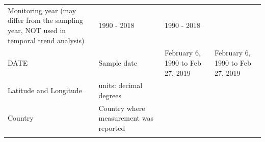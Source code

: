 \documentclass[
  12pt,
]{article}
\begin{document}
\begin{longtable}[]{@{}llll@{}}
\begin{minipage}[t]{0.22\columnwidth}
Monitoring year (may differ from the sampling year, NOT used in temporal
trend analysis)\strut
\end{minipage} & \begin{minipage}[t]{0.25\columnwidth}\raggedright
1990 - 2018\strut
\end{minipage} & \begin{minipage}[t]{0.25\columnwidth}\raggedright
1990 - 2018\strut
\end{minipage}\tabularnewline
\begin{minipage}[t]{0.15\columnwidth}\raggedright
DATE\strut
\end{minipage} & \begin{minipage}[t]{0.22\columnwidth}\raggedright
Sample date\strut
\end{minipage} & \begin{minipage}[t]{0.25\columnwidth}\raggedright
February 6, 1990 to Feb 27, 2019\strut
\end{minipage} & \begin{minipage}[t]{0.25\columnwidth}\raggedright
February 6, 1990 to Feb 27, 2019\strut
\end{minipage}\tabularnewline
\begin{minipage}[t]{0.15\columnwidth}\raggedright
Latitude and Longitude\strut
\end{minipage} & \begin{minipage}[t]{0.22\columnwidth}\raggedright
units: decimal degrees\strut
\end{minipage} & \begin{minipage}[t]{0.25\columnwidth}\raggedright
\strut
\end{minipage} & \begin{minipage}[t]{0.25\columnwidth}\raggedright
\strut
\end{minipage}\tabularnewline
\begin{minipage}[t]{0.15\columnwidth}\raggedright
Country\strut
\end{minipage} & \begin{minipage}[t]{0.22\columnwidth}\raggedright
Country where measurement was reported\strut
\end{minipage} & \begin{minipage}[t]{0.25\columnwidth}\raggedright
\strut
\end{minipage} & \begin{minipage}[t]{0.25\columnwidth}\raggedright
\strut
\end{minipage}\tabularnewline
\begin{minipage}[t]{0.15\columnwidth}\raggedright

\end{minipage}
\end{longtable}
\end{document}
